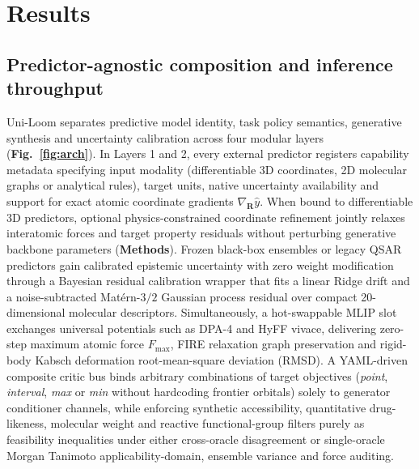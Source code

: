 \documentclass[11pt,a4paper]{article}
\begin{document}
\section*{Results}

\subsection*{Predictor-agnostic composition and inference throughput}

Uni-Loom separates predictive model identity, task policy semantics, generative synthesis and uncertainty calibration across four modular layers (\textbf{Fig.~\ref{fig:arch}}). In Layers 1 and 2, every external predictor registers capability metadata specifying input modality (differentiable 3D coordinates, 2D molecular graphs or analytical rules), target units, native uncertainty availability and support for exact atomic coordinate gradients $\nabla_{\mathbf{R}}\hat{y}$. When bound to differentiable 3D predictors, optional physics-constrained coordinate refinement jointly relaxes interatomic forces and target property residuals without perturbing generative backbone parameters (\textbf{Methods}). Frozen black-box ensembles or legacy QSAR predictors gain calibrated epistemic uncertainty with zero weight modification through a Bayesian residual calibration wrapper that fits a linear Ridge drift and a noise-subtracted Mat\'ern-$3/2$ Gaussian process residual over compact 20-dimensional molecular descriptors. Simultaneously, a hot-swappable MLIP slot exchanges universal potentials such as DPA-4\cite{deepmodeling2026dpa4} and HyFF vivace\cite{hyra2026hyff}, delivering zero-step maximum atomic force $F_{\max}$, FIRE relaxation graph preservation and rigid-body Kabsch deformation root-mean-square deviation (RMSD). A YAML-driven composite critic bus binds arbitrary combinations of target objectives (\textit{point}, \textit{interval}, \textit{max} or \textit{min} without hardcoding frontier orbitals) solely to generator conditioner channels, while enforcing synthetic accessibility\cite{ertl2009sa}, quantitative drug-likeness\cite{bickerton2012qed}, molecular weight and reactive functional-group filters purely as feasibility inequalities under either cross-oracle disagreement or single-oracle Morgan Tanimoto applicability-domain, ensemble variance and force auditing.
\end{document}

